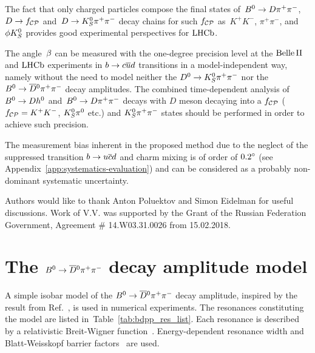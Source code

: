 \documentclass[a4paper,11pt]{article}
\begin{document}
The fact that only charged particles compose the final states of~$B^0\to D\pi^+\pi^-$, 
$D\to f_{\mathcal{CP}}$ and~$D\to K_S^0\pi^+\pi^-$ decay chains for such $f_{\mathcal{CP}}$ as~$K^+K^-$, $\pi^+\pi^-$, 
and $\phi K_S^0$ provides good experimental perspectives for $\mathrm{LHCb}$.

The angle~$\beta$ can be measured with the one-degree precision level at the 
$\mathrm{Belle}\,\mathrm{II}$ and $\mathrm{LHCb}$ experiments in $b\to c\overline{u}d$ transitions in a 
model-independent way, namely without the need to model neither the 
$D^0 \to K_S^0\pi^+\pi^-$ nor the $B^0\to\overline{D}{}^0\pi^+\pi^-$ decay amplitudes. The combined 
time-dependent analysis of~$B^0\to D h^0$ and~$B^0\to D\pi^+\pi^-$ decays with $D$ meson decaying into a $f_{\mathcal{CP}}$ 
($f_{\mathcal{CP}}=K^+K^-$, $K_S^0\pi^0$ etc.) and $K_S^0\pi^+\pi^-$ states should be performed 
in order to achieve such precision.

The measurement bias inherent in the proposed method due to the neglect of 
the suppressed transition $b\to u\overline{c}d$ and charm mixing is of order of $0.2{}^{\circ}$ 
(see Appendix~\ref{app:systematics-evaluation}) and can be considered 
as a probably non-dominant systematic uncertainty.

\acknowledgments
Authors would like to thank Anton Poluektov and Simon Eidelman for 
useful discussions. Work of V.V. was supported by the Grant of the Russian 
Federation Government, Agreement \# 14.W03.31.0026 from 15.02.2018.

\appendix
\section{\boldmath The \texorpdfstring{$B^0\to\overline{D}{}^0\pi^+\pi^-$}{B0 -> anti-D0 pi+ pi-} decay amplitude model}\label{app:decay_ampl}
A simple isobar model of the $B^0\to\overline{D}{}^0\pi^+\pi^-$ decay amplitude, inspired by the result 
from Ref.~\cite{bdpp_belle}, is used in numerical experiments.  The resonances 
constituting the model are listed in~Table~\ref{tab:bdpp_res_list}.  Each 
resonance is described by a relativistic Breit-Wigner function~\cite{breit-wigner}.  
Energy-dependent resonance width and Blatt-Weisskopf barrier factors~\cite{blatt-weiisskopf1,
blatt-weiisskopf2} are used.
\end{document}
